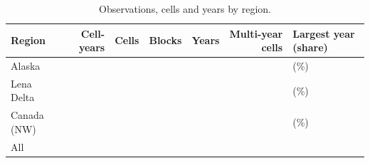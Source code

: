 \begin{table}[p]
\caption{Observations, cells and years by region.}\label{tab:data}
\begin{tabular}{lrrrrrl}
\toprule
Region & Cell-years & Cells & Blocks & Years & Multi-year cells & Largest year (share) \\
\midrule
Alaska & \nncyAk{} & \nncellAk{} & \nnblkAk{} & \nnyrAk{} & \nnmultiAk{} & \ntopyrAk{} (\ntopyrshareAk{}\%) \\
Lena Delta & \nncyLe{} & \nncellLe{} & \nnblkLe{} & \nnyrLe{} & \nnmultiLe{} & \ntopyrLe{} (\ntopyrshareLe{}\%) \\
Canada (NW) & \nncyCa{} & \nncellCa{} & \nnblkCa{} & \nnyrCa{} & \nnmultiCa{} & \ntopyrCa{} (\ntopyrshareCa{}\%) \\
\midrule
All & \nncyAll{} & \nncellAll{} & & & & \\
\bottomrule
\end{tabular}
\end{table}
